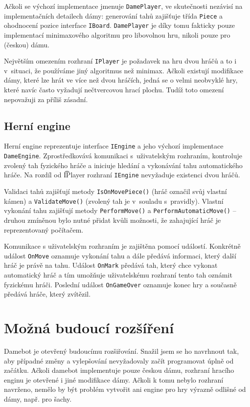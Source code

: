 \documentclass[a4paper,12pt]{article}
\renewcommand{\tt}[1]{\texttt{#1}}
\begin{document}
	Ačkoli se výchozí implementace jmenuje \tt{DamePlayer}, ve skutečnosti ne\-zá\-vi\-sí na implementačních detailech dámy: generování tahů zajišťuje třída \tt{Piece} a ohodnocení pozice interface \tt{IBoard}. \tt{DamePlayer} je díky tomu fakticky pouze implementací minimaxového algoritmu pro libovolnou hru, nikoli pouze pro (českou) dámu.
	
	Největším omezením rozhraní \tt{IPlayer} je požadavek na hru dvou hráčů a to i v~situaci, že používáme jiný algoritmus než minimax. Ačkoli existují modifikace dámy, které lze hrát ve více než dvou hráčích, jedná se o velmi neobvyklé hry, které navíc často vyžadují nečtvercovou hrací plochu. Tudíž toto omezení nepovažuji za příliš zásadní.
	
	\subsection{Herní engine}
	Herní engine reprezentuje interface \tt{IEngine} a jeho výchozí implementace \tt{DameEngine}. Zprostředkovává komunikaci s~uživatelským rozhraním, kontroluje zvolený tah fyzického hráče a iniciuje hledání a vykonávání tahu automatického hráče. Na rozdíl od \t{IPlayer} rozhraní \tt{IEngine} nevyžaduje existenci dvou hráčů.
	
	Validaci tahů zajišťují metody \tt{IsOnMovePiece()} (hráč označil svůj vlast\-ní kámen) a \tt{ValidateMove()} (zvolený tah je v~souladu s~pravidly). Vlastní vykonání tahu zajišťují metody \tt{PerformMove()} a \tt{PerformAutomaticMove()} -- druhou zmíněnou bylo nutné přidat kvůli možnosti, že zahajující hráč je reprezentovaný počítačem.
	
	Komunikace s uživatelským rozhraním je zajištěna pomocí událostí. Kon\-krét\-ně událost \tt{OnMove} oznamuje vykonání tahu a dále předává informaci, který další hráč je právě na tahu. Událost \tt{OnMark} předává tah, který chce vykonat automatický hráč a tím umožňuje uživatelskému rozhraní tento tah oznámit fyzickému hráči. Poslední událost \tt{OnGameOver} oznamuje konec hry a současně předává hráče, který zvítězil.
	
	\section{Možná budoucí rozšíření}
	Damebot je otevřený budoucímu rozšiřování. Snažil jsem se ho navrhnout tak, aby případné změny a vylepšování
	nevyžadovaly začít programovat úplně od začátku. Ačkoli damebot implementuje pouze českou dámu, rozhraní hracího enginu je otevřené i jiné modifikace dámy. Ačkoli k tomu nebylo rozhraní navrženo, nemělo by být problém vytvořit ani
	engine pro hry výrazně odlišné od dámy, např. pro šachy.
	
\end{document}
